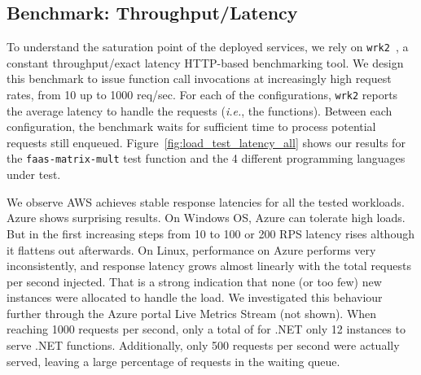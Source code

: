 \subsection{Benchmark: Throughput/Latency}
\label{sec:loadtest}
To understand the saturation point of the deployed services, we rely on \texttt{wrk2}~\cite{wrk2}, a constant throughput/exact latency HTTP-based benchmarking tool.
We design this benchmark to issue function call invocations at increasingly high request rates, from 10 up to 1000 req/sec.
For each of the configurations, \texttt{wrk2} reports the average latency to handle the requests (\emph{i.e.}, the functions).
Between each configuration, the benchmark waits for sufficient time to process potential requests still enqueued.
Figure~\ref{fig:load_test_latency_all} shows our results for the \texttt{faas-matrix-mult} test function and the 4 different programming languages under test.

We observe \gls{AWS} achieves stable response latencies for all the tested workloads. 
Azure shows surprising results. 
On Windows OS, Azure can tolerate high loads.
But in the first increasing steps from 10 to 100 or 200 RPS latency rises although it flattens out afterwards. 
On Linux, performance on Azure performs very inconsistently, and response latency grows almost linearly with the total requests per second injected. 
That is a strong indication that none (or too few) new instances were allocated to handle the load. 
We investigated this behaviour further through the Azure portal Live Metrics Stream (not shown). 
When reaching 1000 requests per second, only a total of for .NET only 12 instances to serve .NET functions. %
Additionally, only 500 requests per second were actually served, leaving a large percentage of requests in the waiting queue.

